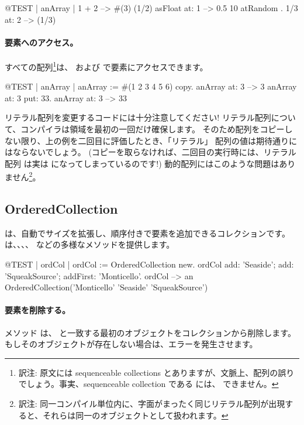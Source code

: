 \documentclass[a4paper,10pt,twoside]{book}
\begin{document}
\begin{code}{@TEST | anArray |}
{ 1 + 2 } --> #(3)
{(1/2) asFloat} at: 1 --> 0.5
{10 atRandom . 1/3} at: 2 --> (1/3)
\end{code}

\paragraph{要素へのアクセス。}
すべての配列\footnote{訳注: 原文には sequenceable collections とありますが、文脈上、配列の誤りでしょう。事実、sequenceable collection である  には、 できません。}は、 および  で要素にアクセスできます。

\begin{code}{@TEST | anArray |}
anArray := #(1 2 3 4 5 6) copy.
anArray at: 3 --> 3
anArray at: 3 put: 33.
anArray at: 3 --> 33
\end{code}

\noindent
リテラル配列を変更するコードには十分注意してください!
リテラル配列について、コンパイラは領域を最初の一回だけ確保します。
そのため配列をコピーしない限り、上の例を二回目に評価したとき、「リテラル」 配列の値は期待通りにはならないでしょう。
(コピーを取らなければ、二回目の実行時には、リテラル配列  は実は  になってしまっているのです!)
動的配列にはこのような問題はありません\footnote{訳注: 同一コンパイル単位内に、字面がまったく同じリテラル配列が出現すると、それらは同一のオブジェクトとして扱われます。}。

\subsection{OrderedCollection}
 は、自動でサイズを拡張し、順序付きで要素を追加できるコレクションです。 は、、、、 などの多様なメソッドを提供します。

\begin{code}{@TEST | ordCol |}
ordCol := OrderedCollection new.
ordCol add: 'Seaside'; add: 'SqueakSource'; addFirst: 'Monticello'.
ordCol --> an OrderedCollection('Monticello' 'Seaside' 'SqueakSource')
\end{code}

\paragraph{要素を削除する。} メソッド   は、 と一致する最初のオブジェクトをコレクションから削除します。もしそのオブジェクトが存在しない場合は、エラーを発生させます。
\end{document}
